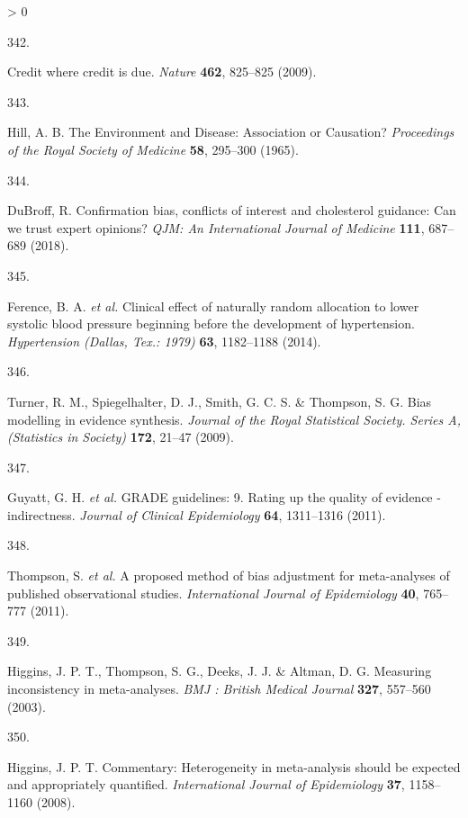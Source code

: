\documentclass[a4paper, twoside]{templates/ociamthesis}
\newlength{\cslhangindent}
\newlength{\csllabelwidth}
\newenvironment{CSLReferences}[3] %
 {%
  \setlength{\parindent}{0pt}
  \ifodd #1 \everypar{\setlength{\hangindent}{\cslhangindent}}\ignorespaces\fi
  \ifnum #2 > 0
  \setlength{\parskip}{#2\baselineskip}
  \fi
 }%
 {}
\newcommand{\CSLLeftMargin}[1]{\parbox[t]{\maxof{\widthof{#1}}{\csllabelwidth}}{#1}}
\newcommand{\CSLRightInline}[1]{\parbox[t]{\linewidth - \csllabelwidth}{#1}}
\begin{document}
\begin{CSLReferences}{0}{0}
\leavevmode\hypertarget{ref-nature2009}{}%
\CSLLeftMargin{342. }
\CSLRightInline{Credit where credit is due. \emph{Nature} \textbf{462}, 825--825 (2009).}

\leavevmode\hypertarget{ref-hill1965}{}%
\CSLLeftMargin{343. }
\CSLRightInline{Hill, A. B. The {Environment} and {Disease}: Association or {Causation}? \emph{Proceedings of the Royal Society of Medicine} \textbf{58}, 295--300 (1965).}

\leavevmode\hypertarget{ref-dubroff2018}{}%
\CSLLeftMargin{344. }
\CSLRightInline{DuBroff, R. Confirmation bias, conflicts of interest and cholesterol guidance: Can we trust expert opinions? \emph{QJM: An International Journal of Medicine} \textbf{111}, 687--689 (2018).}

\leavevmode\hypertarget{ref-ference2014}{}%
\CSLLeftMargin{345. }
\CSLRightInline{Ference, B. A. \emph{et al.} Clinical effect of naturally random allocation to lower systolic blood pressure beginning before the development of hypertension. \emph{Hypertension (Dallas, Tex.: 1979)} \textbf{63}, 1182--1188 (2014).}

\leavevmode\hypertarget{ref-turner2009}{}%
\CSLLeftMargin{346. }
\CSLRightInline{Turner, R. M., Spiegelhalter, D. J., Smith, G. C. S. \& Thompson, S. G. Bias modelling in evidence synthesis. \emph{Journal of the Royal Statistical Society. Series A, (Statistics in Society)} \textbf{172}, 21--47 (2009).}

\leavevmode\hypertarget{ref-guyatt2011}{}%
\CSLLeftMargin{347. }
\CSLRightInline{Guyatt, G. H. \emph{et al.} {GRADE} guidelines: 9. {Rating} up the quality of evidence - indirectness. \emph{Journal of Clinical Epidemiology} \textbf{64}, 1311--1316 (2011).}

\leavevmode\hypertarget{ref-thompson2011}{}%
\CSLLeftMargin{348. }
\CSLRightInline{Thompson, S. \emph{et al.} A proposed method of bias adjustment for meta-analyses of published observational studies. \emph{International Journal of Epidemiology} \textbf{40}, 765--777 (2011).}

\leavevmode\hypertarget{ref-higgins2003}{}%
\CSLLeftMargin{349. }
\CSLRightInline{Higgins, J. P. T., Thompson, S. G., Deeks, J. J. \& Altman, D. G. Measuring inconsistency in meta-analyses. \emph{BMJ : British Medical Journal} \textbf{327}, 557--560 (2003).}

\leavevmode\hypertarget{ref-higgins2008}{}%
\CSLLeftMargin{350. }
\CSLRightInline{Higgins, J. P. T. Commentary: Heterogeneity in meta-analysis should be expected and appropriately quantified. \emph{International Journal of Epidemiology} \textbf{37}, 1158--1160 (2008).}


\end{CSLReferences}
\end{document}
